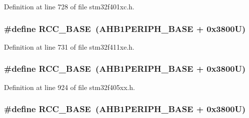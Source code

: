Definition at line 728 of file stm32f401xc.\+h.

\subsubsection[{\texorpdfstring{R\+C\+C\+\_\+\+B\+A\+SE}{RCC_BASE}}]{\setlength{\rightskip}{0pt plus 5cm}\#define R\+C\+C\+\_\+\+B\+A\+SE~({\bf A\+H\+B1\+P\+E\+R\+I\+P\+H\+\_\+\+B\+A\+SE} + 0x3800\+U)}\hypertarget{group___peripheral__registers__structures_ga0e681b03f364532055d88f63fec0d99d}{}\label{group___peripheral__registers__structures_ga0e681b03f364532055d88f63fec0d99d}


Definition at line 731 of file stm32f411xe.\+h.

\subsubsection[{\texorpdfstring{R\+C\+C\+\_\+\+B\+A\+SE}{RCC_BASE}}]{\setlength{\rightskip}{0pt plus 5cm}\#define R\+C\+C\+\_\+\+B\+A\+SE~({\bf A\+H\+B1\+P\+E\+R\+I\+P\+H\+\_\+\+B\+A\+SE} + 0x3800\+U)}\hypertarget{group___peripheral__registers__structures_ga0e681b03f364532055d88f63fec0d99d}{}\label{group___peripheral__registers__structures_ga0e681b03f364532055d88f63fec0d99d}


Definition at line 924 of file stm32f405xx.\+h.

\subsubsection[{\texorpdfstring{R\+C\+C\+\_\+\+B\+A\+SE}{RCC_BASE}}]{\setlength{\rightskip}{0pt plus 5cm}\#define R\+C\+C\+\_\+\+B\+A\+SE~({\bf A\+H\+B1\+P\+E\+R\+I\+P\+H\+\_\+\+B\+A\+SE} + 0x3800\+U)}\hypertarget{group___peripheral__registers__structures_ga0e681b03f364532055d88f63fec0d99d}{}\label{group___peripheral__registers__structures_ga0e681b03f364532055d88f63fec0d99d}


